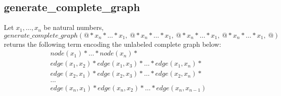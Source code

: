     \subsection*{generate\_complete\_graph}
    Let $x_1,\ldots,x_n$ be natural numbers, $generate\_complete\_graph(@ * x_n * \ldots * x_1,\ @ * x_n * \ldots * x_1,\ @ * x_n * \ldots * x_1,\ @ * x_n * \ldots * x_1,\ @)$
       returns the following term encoding the unlabeled complete graph below:
        \begin{align*}
            & node(x_1) * \ldots * node(x_n) * \\
            & edge(x_1,x_2) * edge(x_1,x_3) * \ldots * edge(x_1,x_n) * \\
            & edge(x_2,x_1) * edge(x_2,x_3) * \ldots * edge(x_2,x_n) * \\
            & \ldots \\
            & edge(x_n,x_1) * edge(x_n,x_2) * \ldots * edge(x_n,x_{n-1})
        \end{align*}
    
